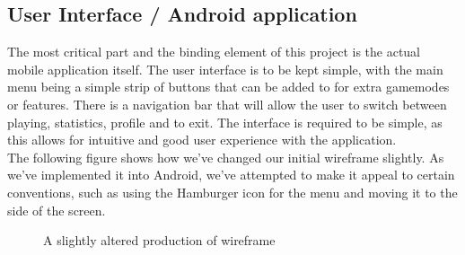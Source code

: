 \documentclass[11pt]{article}
\begin{document}
\newpage
\subsection{User Interface / Android application}

The most critical part and the binding element of this project is the actual mobile application itself. The user interface is to be kept simple, with the main menu being a simple strip of buttons that can be added to for extra gamemodes or features. There is a navigation bar that will allow the user to switch between playing, statistics, profile and to exit. 
The interface is required to be simple, as this allows for intuitive and good user experience with the application. \\

The following figure shows how we've changed our initial wireframe slightly. As we've implemented it into Android, we've attempted to make it appeal to certain conventions, such as using the Hamburger icon for the menu and moving it to the side of the screen.

\begin{figure}[h]
	
	\caption{A slightly altered production of wireframe}
	
\end{figure}
\end{document}
